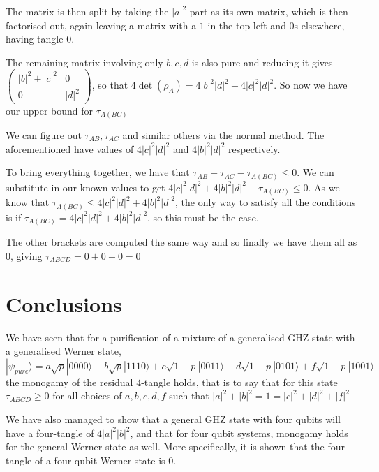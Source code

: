 \documentclass[12pt,a4paper]{article}
\numberwithin{equation}{section}
\begin{document}
\vskip 2mm

The matrix is then split by taking the $|a|^2$ part as its own matrix, which is then factorised out, again leaving a matrix with a $1$ in the top left and $0$s elsewhere, having tangle $0$.

The remaining matrix involving only $b, c, d$ is also pure and reducing it gives $\begin{pmatrix} |b|^2 + |c|^2 & 0 \\ 0 & |d|^2 \end{pmatrix}$, so that $4\det(\rho_{A}) = 4|b|^2|d|^2 + 4|c|^2|d|^2$. So now we have our upper bound for $\tau_{A(BC)}$

We can figure out $\tau_{AB}, \tau_{AC}$ and similar others via the normal method. The aforementioned have values of $4|c|^2|d|^2$ and $4|b|^2|d|^2$ respectively.

\vskip 2mm

To bring everything together, we have that $\tau_{AB} + \tau_{AC} - \tau_{A(BC)} \leq 0$. We can substitute in our known values to get $4|c|^2|d|^2 + 4|b|^2|d|^2 - \tau_{A(BC)} \leq 0$. As we know that $\tau_{A(BC)} \leq 4|c|^2|d|^2 + 4|b|^2|d|^2$, the only way to satisfy all the conditions is if $\tau_{A(BC)} = 4|c|^2|d|^2 + 4|b|^2|d|^2$, so this must be the case.

The other brackets are computed the same way and so finally we have them all as $0$, giving $\tau_{ABCD} = 0 + 0 + 0 = 0$

\newpage

\section{Conclusions}
\label{sec:conclusions}

We have seen that for a purification of a mixture of a generalised GHZ state with a generalised Werner state, $|\psi_{pure}\rangle = a\sqrt{p}|0000\rangle + b\sqrt{p}|1110\rangle + c\sqrt{1-p}|0011\rangle + d\sqrt{1-p}|0101\rangle + f\sqrt{1-p}|1001\rangle$ the monogamy of the residual $4$-tangle holds, that is to say that for this state $\tau_{ABCD} \geq 0$ for all choices of $a, b, c, d, f$ such that $|a|^2 + |b|^2 = 1 = |c|^2 + |d|^2 + |f|^2$

We have also managed to show that a general GHZ state with four qubits will have a four-tangle of $4|a|^2|b|^2$, and that for four qubit systems, monogamy holds for the general Werner state as well. More specifically, it is shown that the four-tangle of a  four qubit Werner state is $0$.
\end{document}
